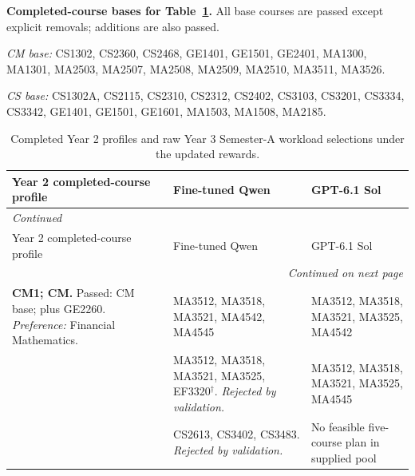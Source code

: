 \documentclass{article}
\begin{document}
\textbf{Completed-course bases for Table~\ref{tab:retest-input07}.} All base courses are passed except explicit removals; additions are also passed. 

\textit{CM base:} CS1302, CS2360, CS2468, GE1401, GE1501, GE2401, MA1300, MA1301, MA2503, MA2507, MA2508, MA2509, MA2510, MA3511, MA3526.

\textit{CS base:} CS1302A, CS2115, CS2310, CS2312, CS2402, CS3103, CS3201, CS3334, CS3342, GE1401, GE1501, GE1601, MA1503, MA1508, MA2185.

{\small
\setlength{\tabcolsep}{4pt}
\renewcommand{\arraystretch}{1.12}
\begin{longtable}{p{2.45in}p{1.35in}p{1.35in}}
\caption{Completed Year 2 profiles and raw Year 3 Semester-A workload selections under the updated rewards.}\label{tab:retest-input07}\\
\toprule
Year 2 completed-course profile & Fine-tuned Qwen & GPT-6.1 Sol\\
\midrule
\endfirsthead
\multicolumn{3}{l}{\textit{Continued}}\\
\toprule
Year 2 completed-course profile & Fine-tuned Qwen & GPT-6.1 Sol\\
\midrule
\endhead
\midrule
\multicolumn{3}{r}{\textit{Continued on next page}}\\
\endfoot
\bottomrule
\endlastfoot
{\raggedright \textbf{CM1; CM.} Passed: CM base; plus GE2260. \textit{Preference:} Financial Mathematics.\par} & {\raggedright MA3512, MA3518, MA3521, MA4542, MA4545\par} & {\raggedright MA3512, MA3518, MA3521, MA3525, MA4542\par}\\
\addlinespace[4pt]
{\raggedright \textbf{CM2; CM.} Passed: CM base except MA3526; plus GE2260. \textit{Preference:} Financial Mathematics.\par} & {\raggedright MA3512, MA3518, MA3521, MA3525, EF3320$^{\dagger}$. \textit{Rejected by validation.}\par} & {\raggedright MA3512, MA3518, MA3521, MA3525, MA4545\par}\\
\addlinespace[4pt]
{\raggedright \textbf{CS2; CS.} Passed: CS base except CS3342; plus GE2340. \textit{Preference:} Artificial Intelligence.\par} & {\raggedright CS2613, CS3402, CS3483. \textit{Rejected by validation.}\par} & {\raggedright No feasible five-course plan in supplied pool\par}\\
\end{longtable}
}
\end{document}
